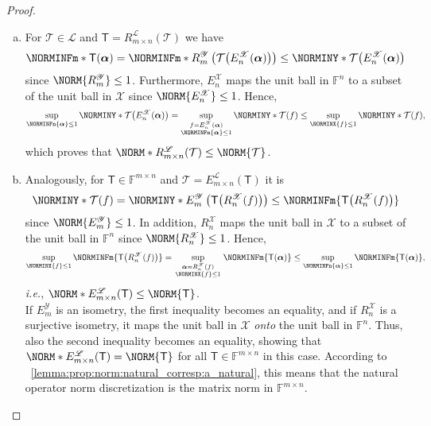 \documentclass[a4paper]{paper}
\newcommand*{\SPC}[1]{{\ensuremath{\mathscr{#1}}}}
\newcommand*{\SPCL}{\SPC{L}}
\newcommand*{\SPCX}{\SPC{X}}
\newcommand{\FIELD}{{\ensuremath{\mathbb{F}}}}
\newcommand*{\Fn}{{\ensuremath{\FIELD^n}}}
\newcommand*{\Fmxn}{{\ensuremath{\FIELD^{m \times n}}}}
\newcommand*{\OP}[1]{{\ensuremath{\mathcal{#1}}}}
\newcommand*{\OPT}{\OP{T}}
\newcommand{\DISCOP}[1]{{\ensuremath{\mathsf{#1}}}}
\newcommand*{\DISCOPT}{\DISCOP{T}}
\newcommand*{\EXT}[2]{\ensuremath{E_{#1}^{#2}}}
\newcommand*{\REST}[2]{\ensuremath{R_{#1}^{#2}}}
\newcommand*{\RnX}{{\ensuremath{\REST{n}{\SPC{X}}}}}
\newcommand*{\RmY}{{\ensuremath{\REST{m}{\SPC{Y}}}}}
\newcommand*{\EnX}{{\ensuremath{\EXT{n}{\SPC{X}}}}}
\newcommand*{\EmY}{{\ensuremath{\EXT{m}{\SPC{Y}}}}}
\newcommand*{\STACK}[2]{\genfrac{}{}{0pt}{1}{#1}{#2}}
\newcommand{\ie}{\textsl{i.e.}\xspace}
\newcommand{\valpha}{\boldsymbol{\alpha}}
\begin{document}
\begin{proof}~
 \begin{enumerate}[(a)]
  \item For $\OPT \in \SPCL$ and $\DISCOPT = \REST{m\times n}{\SPCL}(\OPT)$ we have
  \begin{equation*}
   \NORMINFm*{\DISCOPT(\valpha)} = \NORMINFm*{\RmY \left( \OPT\big( \EnX(\valpha) \big) \right)}
   \leq \NORMINY*{\OPT\big( \EnX(\valpha) \big)}
  \end{equation*}
  since $\NORM{\RmY} \leq 1$. Furthermore, $\EnX$ maps the unit ball in $\Fn$ to a subset of the unit ball in
  $\SPCX$ since $\NORM{\EnX} \leq 1$. Hence,
  \begin{equation*}
   \sup_{\NORMINFn{\valpha} \leq 1} \NORMINY*{\OPT\big( \EnX(\valpha) \big)}
   = \sup_{\substack{f=\EnX(\valpha)\\ \NORMINFn{\valpha} \leq 1}} \NORMINY*{\OPT(f)}
   \leq \sup_{\NORMINX{f} \leq 1} \NORMINY*{\OPT(f)},
  \end{equation*}
  which proves that $\NORM*{\REST{m\times n}{\SPCL}(\OPT)} \leq \NORM{\OPT}$.

  \item Analogously, for $\DISCOPT \in \Fmxn$ and $\OPT = \EXT{m\times n}{\SPCL}(\DISCOPT)$ it is
  \begin{equation*}
   \NORMINY*{\OPT(f)} = \NORMINY*{\EmY \left( \DISCOPT\big( \RnX(f) \big) \right)}
   \leq \NORMINFm{\DISCOPT\big( \RnX(f) \big)}
  \end{equation*}
  since $\NORM{\EmY} \leq 1$. In addition, $\RnX$ maps the unit ball in $\SPCX$ to a subset of the unit 
  ball in $\Fn$ since $\NORM{\RnX} \leq 1$. Hence,
  \begin{equation*}
   \sup_{\NORMINX{f} \leq 1} \NORMINFm{\DISCOPT\big( \RnX(f) \big)}
   = \sup_{\STACK{\valpha=\RnX(f)}{\NORMINX{f} \leq 1}} \NORMINFm{\DISCOPT(\valpha)}
   \leq \sup_{\NORMINFn{\valpha} \leq 1} \NORMINFm{\DISCOPT(\valpha)},
  \end{equation*}
  \ie, $\NORM*{E_{m\times n}^{\SPCL}(\DISCOPT)} \leq \NORM{\DISCOPT}$.\\[1em]
  If $\EmY$ is an isometry, the first inequality becomes an equality, and if $\RnX$ is a surjective isometry, it maps
  the unit ball in $\SPCX$ \emph{onto} the unit ball in $\Fn$. Thus, also the second inequality becomes an 
  equality, showing that $\NORM*{\EXT{m\times n}{\SPCL}(\DISCOPT)} = \NORM{\DISCOPT}$ for all 
  $\DISCOPT \in \Fmxn$ in this case. According to 
  ~\eqref{lemma:prop:norm:natural_corresp:a_natural}, this means that the natural 
  operator norm discretization is the matrix norm in $\Fmxn$.
 \end{enumerate}
\end{proof}
\end{document}
